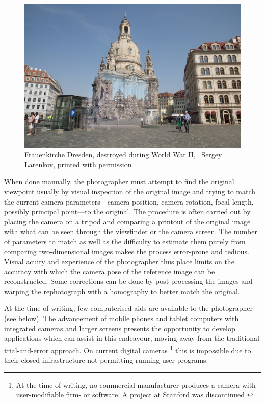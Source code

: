 \begin{figure}
   \includegraphics[width=\textwidth]{gfx/1950_2014_Frauenkirche_small.jpg}
   \caption{Frauenkirche Dresden, destroyed during World War II,
   \textcopyright\ Sergey Larenkov, printed with permission}
   \label{fig2}
\end{figure}

When done manually, the photographer must attempt to find the original viewpoint 
usually by visual inspection of the original image and trying to match the
current camera parameters---camera position, camera rotation, focal length,
possibly principal point---to the original.
The procedure is often carried out by placing the camera on a tripod and
comparing a printout of the original image with what can be seen through the
viewfinder or the camera screen. The number of parameters to match as well as
the difficulty to estimate them purely from comparing two-dimensional images makes the process
error-prone and tedious. Visual acuity and experience of the photographer thus
place limits on the accuracy with which the camera pose of the reference image
can be reconstructed. Some corrections can be done by post-processing the images
and warping the rephotograph with a homography to better match the original.

At the time of writing, few computerised aids are available to the photographer
(see below).  The advancement of mobile phones and tablet computers with
integrated cameras and larger screens presents the opportunity to develop
applications which can assist in this endeavour, moving away from the
traditional trial-and-error approach.  On current digital cameras
\footnote{At the time of writing, no commercial manufacturer produces a camera with
   user-modifiable firm- or software. A project at Stanford \citep{Levoy2010}
was discontinued \cite{FrankenCam}} 
this is impossible due to their closed
infrastructure not permitting running user programs. 

